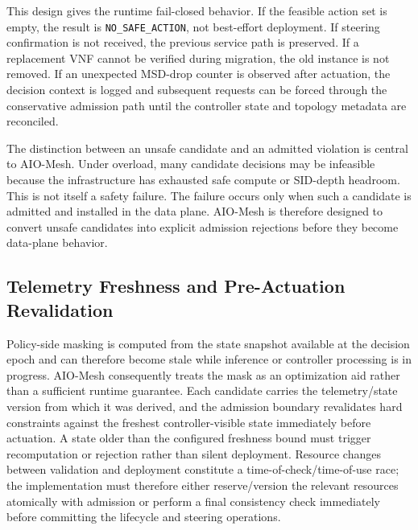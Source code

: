 \documentclass[final,5p]{elsarticle}
\newenvironment{revision}{\color{red}}{}
\begin{document}
This design gives the runtime fail-closed behavior. If the feasible action set is empty, the result is \texttt{NO\_SAFE\_ACTION}, not best-effort deployment. If steering confirmation is not received, the previous service path is preserved. If a replacement VNF cannot be verified during migration, the old instance is not removed. If an unexpected MSD-drop counter is observed after actuation, the decision context is logged and subsequent requests can be forced through the conservative admission path until the controller state and topology metadata are reconciled.

The distinction between an unsafe candidate and an admitted violation is central to AIO-Mesh. Under overload, many candidate decisions may be infeasible because the infrastructure has exhausted safe compute or SID-depth headroom. This is not itself a safety failure. The failure occurs only when such a candidate is admitted and installed in the data plane. AIO-Mesh is therefore designed to convert unsafe candidates into explicit admission rejections before they become data-plane behavior.

\begin{revision}
\subsection{Telemetry Freshness and Pre-Actuation Revalidation}
\label{subsec:freshness_revalidation}
Policy-side masking is computed from the state snapshot available at the decision epoch and can therefore become stale while inference or controller processing is in progress. AIO-Mesh consequently treats the mask as an optimization aid rather than a sufficient runtime guarantee. Each candidate carries the telemetry/state version from which it was derived, and the admission boundary revalidates hard constraints against the freshest controller-visible state immediately before actuation. A state older than the configured freshness bound must trigger recomputation or rejection rather than silent deployment. Resource changes between validation and deployment constitute a time-of-check/time-of-use race; the implementation must therefore either reserve/version the relevant resources atomically with admission or perform a final consistency check immediately before committing the lifecycle and steering operations.
\end{revision}
\end{document}
